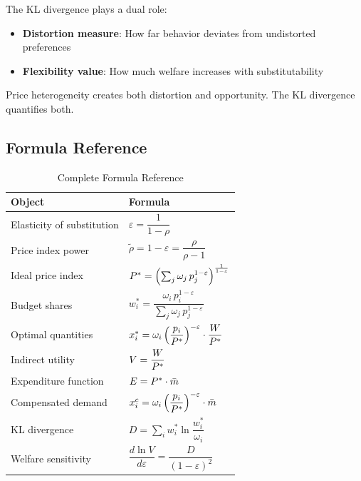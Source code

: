 \begin{calloutimportant}
The KL divergence plays a dual role:
\begin{itemize}[nosep, leftmargin=1.5em]
    \item \textbf{Distortion measure}: How far behavior deviates from undistorted preferences
    \item \textbf{Flexibility value}: How much welfare increases with substitutability
\end{itemize}
Price heterogeneity creates both distortion and opportunity. The KL divergence quantifies both.
\end{calloutimportant}

\subsection{Formula Reference}
\label{subsec:summary-formulas}

\begin{table}[H]
\centering
\caption{Complete Formula Reference}
\label{tab:formula-reference}
\renewcommand{\arraystretch}{1.6}
\begin{tabular}{@{}p{4cm}l@{}}
\toprule
\textbf{Object} & \textbf{Formula} \\
\midrule
Elasticity of substitution & $\varepsilon = \dfrac{1}{1-\rho}$ \\[8pt]
Price index power & $\tilde{\rho} = 1 - \varepsilon = \dfrac{\rho}{\rho - 1}$ \\[8pt]
Ideal price index & $P^{*} = \left( \sum_j \omega_j \, p_j^{1-\varepsilon} \right)^{\frac{1}{1-\varepsilon}}$ \\[8pt]
Budget shares & $w_i^* = \dfrac{\omega_i \, p_i^{1-\varepsilon}}{\sum_j \omega_j \, p_j^{1-\varepsilon}}$ \\[8pt]
Optimal quantities & $x_i^* = \omega_i \left( \dfrac{p_i}{P^{*}} \right)^{-\varepsilon} \cdot \dfrac{W}{P^{*}}$ \\[8pt]
Indirect utility & $V = \dfrac{W}{P^{*}}$ \\[8pt]
Expenditure function & $E = P^{*} \cdot \bar{m}$ \\[8pt]
Compensated demand & $x_i^c = \omega_i \left( \dfrac{p_i}{P^{*}} \right)^{-\varepsilon} \cdot \bar{m}$ \\[8pt]
KL divergence & $D = \sum_i w_i^* \ln \dfrac{w_i^*}{\omega_i}$ \\[8pt]
Welfare sensitivity & $\dfrac{d \ln V}{d\varepsilon} = \dfrac{D}{(1-\varepsilon)^2}$ \\
\bottomrule
\end{tabular}
\end{table}


